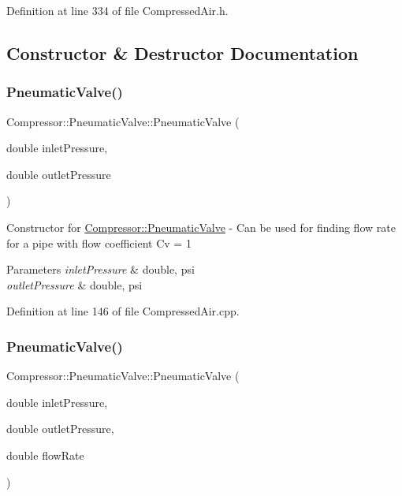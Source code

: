 Definition at line 334 of file Compressed\+Air.\+h.



\subsection{Constructor \& Destructor Documentation}
\mbox{\label{class_compressor_1_1_pneumatic_valve_a8c883ff13640780f40d026984e9116f7}} 
\subsubsection{\texorpdfstring{Pneumatic\+Valve()}{PneumaticValve()}\hspace{0.1cm}{\footnotesize\ttfamily [1/6]}}
{\footnotesize\ttfamily Compressor\+::\+Pneumatic\+Valve\+::\+Pneumatic\+Valve (\begin{DoxyParamCaption}\item[{double}]{inlet\+Pressure,  }\item[{double}]{outlet\+Pressure }\end{DoxyParamCaption})}

Constructor for \hyperlink{class_compressor_1_1_pneumatic_valve}{Compressor\+::\+Pneumatic\+Valve} -\/ Can be used for finding flow rate for a pipe with flow coefficient Cv = 1 
\begin{DoxyParams}{Parameters}
{\em inlet\+Pressure} & double, psi \\
\hline
{\em outlet\+Pressure} & double, psi \\
\hline
\end{DoxyParams}


Definition at line 146 of file Compressed\+Air.\+cpp.

\mbox{\label{class_compressor_1_1_pneumatic_valve_adc3d621e933c23b13d1f20378704336b}} 
\subsubsection{\texorpdfstring{Pneumatic\+Valve()}{PneumaticValve()}\hspace{0.1cm}{\footnotesize\ttfamily [2/6]}}
{\footnotesize\ttfamily Compressor\+::\+Pneumatic\+Valve\+::\+Pneumatic\+Valve (\begin{DoxyParamCaption}\item[{double}]{inlet\+Pressure,  }\item[{double}]{outlet\+Pressure,  }\item[{double}]{flow\+Rate }\end{DoxyParamCaption})}

